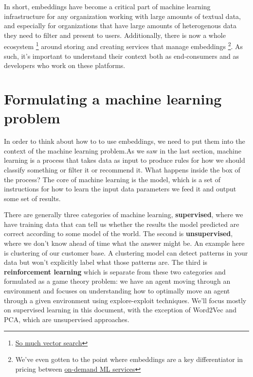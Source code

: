 \documentclass[11pt]{diazessay} %
\begin{document}
In short, embeddings have become a critical part of machine learning infrastructure for any organization working with large amounts of textual data, and especially for organizations that have large amounts of heterogenous data they need to filter and present to users.  Additionally, there is now a whole ecosystem \footnote{\href{https://github.com/currentslab/awesome-vector-search}{So much vector search}} around storing and creating services that manage embeddings \footnote{We've even gotten to the point where embeddings are a key differentiator in pricing between \href{https://openai.com/pricing}{on-demand ML services}}. As such, it's important to understand their context both as end-consumers and as developers who work on these platforms.

\section{Formulating a machine learning problem}

In order to think about how to to use embeddings, we need to put them into the context of the machine learning problem.As we saw in the last section, machine learning is a process that takes data as input to produce rules for how we should classify something or filter it or recommend it. What happens inside the box of the process? The core of machine learning is the model, which is a set of instructions for how to learn the input data parameters we feed it and output some set of results.

There are generally three categories of machine learning, \textbf{supervised}, where we have training data that can tell us whether the results the model predicted are correct according to some model of the world. The second is \textbf{unsupervised}, where we don't know ahead of time what the answer might be. An example here is clustering of our customer base. A clustering model can detect patterns in your data but won't explicitly label what those patterns are. The third is \textbf{reinforcement learning}  which is separate from these two categories and formulated as a game theory problem: we have an agent moving through an environment and focuses on understanding how to optimally move an agent through a given environment using explore-exploit techniques. We'll focus mostly on supervised learning in this document, with the exception of Word2Vec and PCA, which are unsupervised approaches. 
 
\end{document}
